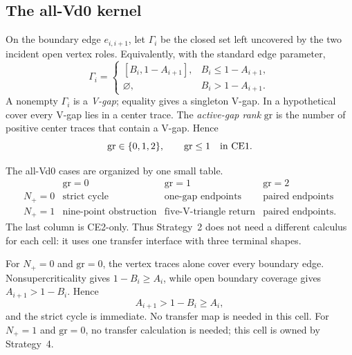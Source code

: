 \subsection{The all-Vd0 kernel}

\begin{definition}
\label{def:body-active-gap-rank}
On the boundary edge $e_{i,i+1}$, let $\Gamma_i$ be the closed set left
uncovered by the two incident open vertex roles.  Equivalently, with the
standard edge parameter,
\[
 \Gamma_i=
 \begin{cases}
  [B_i,1-A_{i+1}],&B_i\le1-A_{i+1},\\
  \varnothing,&B_i>1-A_{i+1}.
 \end{cases}
\]
A nonempty $\Gamma_i$ is a \emph{V-gap}; equality gives a singleton V-gap.
In a hypothetical cover every V-gap lies in a center trace.  The
\emph{active-gap rank} $\mathrm{gr}$ is the number of positive center traces
that contain a V-gap.  Hence
\[
 \mathrm{gr}\in\{0,1,2\},
 \qquad
 \mathrm{gr}\le1\quad\hbox{in CE1}.
\]
\end{definition}

The all-Vd0 cases are organized by one small table.
\[
\begin{array}{c|ccc}
 &\mathrm{gr}=0&\mathrm{gr}=1&\mathrm{gr}=2\\ \hline
N_+=0&\text{strict cycle}&\text{one-gap endpoints}&
       \text{paired endpoints}\\
N_+=1&\text{nine-point obstruction}&\text{five-V-triangle return}&
       \text{paired endpoints}.
\end{array}
\]
The last column is CE2-only.  Thus Strategy~2 does not need a different
calculus for each cell: it uses one transfer interface with three terminal
shapes.

For $N_+=0$ and $\mathrm{gr}=0$, the vertex traces alone cover every boundary
edge.  Nonsupercriticality gives $1-B_i\ge A_i$, while open boundary coverage
gives $A_{i+1}>1-B_i$.  Hence
\[
 A_{i+1}>1-B_i\ge A_i,
\]
and the strict cycle is immediate.  No transfer map is needed in this cell.  For $N_+=1$ and $\mathrm{gr}=0$, no
transfer calculation is needed; this cell is owned by Strategy~4.

